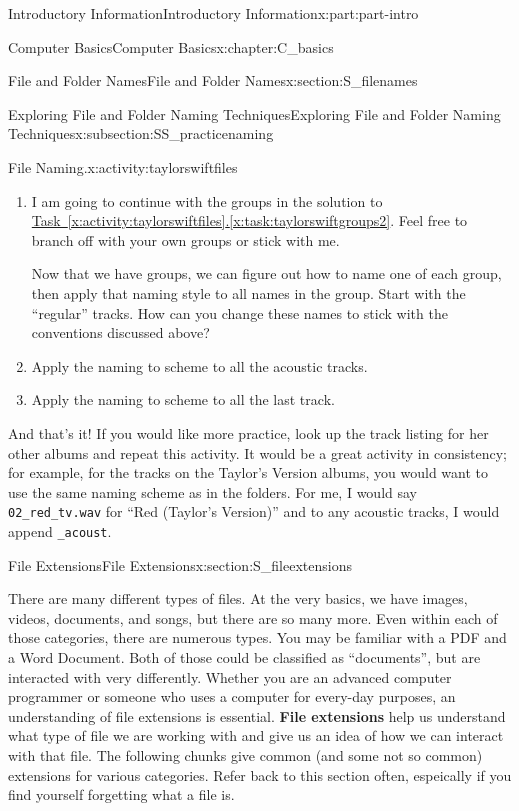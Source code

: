 \documentclass[oneside,10pt,]{book}
\newcommand{\xreffont}{\relax}
\newcommand{\mono}[1]{\texttt{#1}}
\newcommand{\terminology}[1]{\textbf{#1}}
\begin{document}
\begin{partptx}{Introductory Information}{}{Introductory Information}{}{}{x:part:part-intro}
\begin{chapterptx}{Computer Basics}{}{Computer Basics}{}{}{x:chapter:C_basics}
\begin{sectionptx}{File and Folder Names}{}{File and Folder Names}{}{}{x:section:S_filenames}
\begin{subsectionptx}{Exploring File and Folder Naming Techniques}{}{Exploring File and Folder Naming Techniques}{}{}{x:subsection:SS_practicenaming}
\begin{activity}{File Naming.}{x:activity:taylorswiftfiles}
\begin{enumerate}[font=\bfseries,label=(\alph*),ref=\alph*]
\item{}I am going to continue with the groups in the solution to \hyperref[x:task:taylorswiftgroups2]{Task~{\xreffont\ref{x:activity:taylorswiftfiles}}.{\xreffont\ref{x:task:taylorswiftgroups2}}}. Feel free to branch off with your own groups or stick with me.%
\par
Now that we have groups, we can figure out how to name one of each group, then apply that naming style to all names in the group. Start with the ``regular'' tracks. How can you change these names to stick with the conventions discussed above?%
\item{}Apply the naming to scheme to all the acoustic tracks.%
\item{}Apply the naming to scheme to all the last track.%
\end{enumerate}
And that's it! If you would like more practice, look up the track listing for her other albums and repeat this activity. It would be a great activity in consistency; for example, for the tracks on the Taylor's Version albums, you would want to use the same naming scheme as in the folders. For me, I would say \mono{02\_red\_tv.wav} for ``Red (Taylor's Version)'' and to any acoustic tracks, I would append \mono{\_acoust}.%
\end{activity}%
\end{subsectionptx}
\end{sectionptx}
%
%
\typeout{************************************************}
\typeout{************************************************}
%
\begin{sectionptx}{File Extensions}{}{File Extensions}{}{}{x:section:S_fileextensions}
%
\begin{introduction}{}%
There are many different types of files. At the very basics, we have images, videos, documents, and songs, but there are so many more. Even within each of those categories, there are numerous types. You may be familiar with a PDF and a Word Document. Both of those could be classified as ``documents'', but are interacted with very differently. Whether you are an advanced computer programmer or someone who uses a computer for every-day purposes, an understanding of file extensions is essential. \terminology{File extensions} help us understand what type of file we are working with and give us an idea of how we can interact with that file. The following chunks give common (and some not so common) extensions for various categories. Refer back to this section often, espeically if you find yourself forgetting what a file is.%

\end{introduction}
\end{sectionptx}
\end{chapterptx}
\end{partptx}
\end{document}
